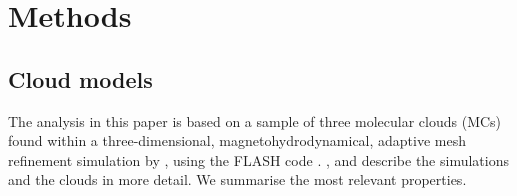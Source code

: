 \section{Methods}\label{methods}


\subsection{Cloud models}\label{methods:clouds}


The analysis in this paper is based on a sample of three molecular clouds (MCs) found within a three-dimensional, 
magnetohydrodynamical,
adaptive mesh refinement
simulation by \citet{IbanezMejia2016}, using the FLASH code \citep{Fryxell2000}.
, and \citet[ hereafter]{Chira2018} describe the simulations and the clouds in more detail. 
We summarise the most relevant properties. 

